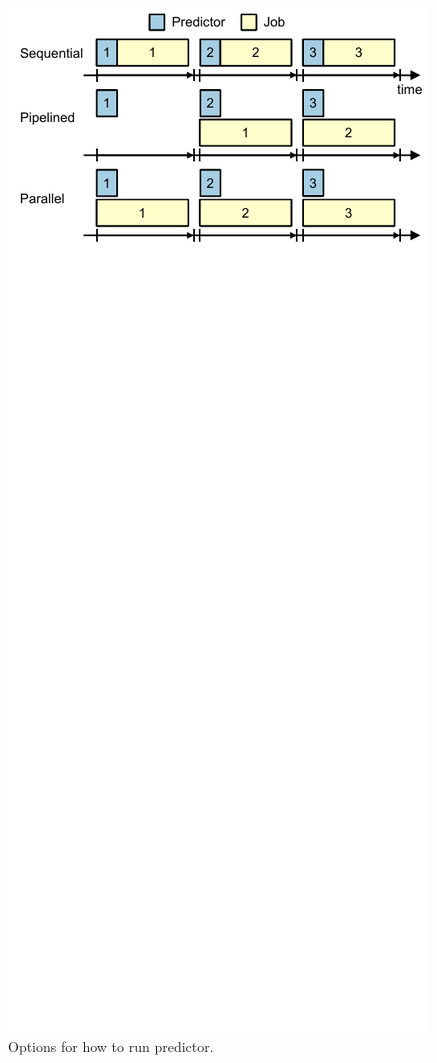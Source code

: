 \begin{figure}
  \begin{center}
    \includegraphics{exec_time_prediction/figs/predictor_operation.pdf}
    \caption{Options for how to run predictor.}
    \label{fig:prototype.predictor_operation}
  \end{center}
\end{figure}

